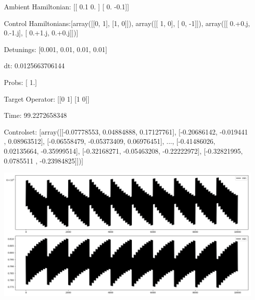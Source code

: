 \documentclass{article}
\begin{document}
    

\newpage

Ambient Hamiltonian: [[ 0.1  0. ]
 [ 0.  -0.1]]

Control Hamiltonians:[array([[0, 1],
       [1, 0]]), array([[ 1,  0],
       [ 0, -1]]), array([[ 0.+0.j,  0.-1.j],
       [ 0.+1.j,  0.+0.j]])]

Detunings: [0.001, 0.01, 0.01, 0.01]

 dt: 0.0125663706144

Probs: [ 1.]

Target Operator: [[0 1]
 [1 0]]

Time: 99.2272658348

Controlset: [array([[-0.07778553,  0.04884888,  0.17127761],
       [-0.20686142, -0.019441  ,  0.08963512],
       [-0.06558479, -0.05373409,  0.06976451],
       ..., 
       [-0.41486026,  0.02135664, -0.35999514],
       [-0.32168271, -0.05463208, -0.22222972],
       [-0.32821995,  0.0785511 , -0.23984825]])]
\begin{center}
\includegraphics[scale=.9]{report_pickled_controls16/control_dpn_all}

\end{center}
\end{document}

